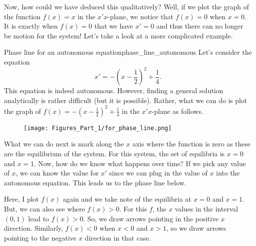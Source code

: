                 Now, how could we have deduced this qualitatively? Well, if we plot the graph of the function $f(x)=x$ in the $x'x$-plane, we notice that $f(x)=0$ when $x=0$.  It is exactly when $f(x)=0$ that we have $x'=0$ and thus there can no longer be motion for the system! Let's take a look at a more complicated example.



                \begin{ex}{Phase line for an autonomous equation}{phase_line_autonomous}
                Let's consider the equation
                \[
                x' = -\left(x-\frac{1}{2}\right)^2+\frac{1}{4}.
                \]
                This equation is indeed autonomous. However, finding a general solution analytically is rather difficult (but it is possible).  Rather, what we can do is plot the graph of $f(x)=-\left(x-\frac{1}{2}\right)^2+\frac{1}{4}$ in the $x'x$-plane as follows.
                \begin{figure}[H]
                    \centering
                    \texttt{[image: Figures\_Part\_1/for\_phase\_line.png]}
                \end{figure}
                What we can do next is mark along the $x$ axis where the function is zero as these are the equilibrium of the system. For this system, the set of equilibria is $x=0$ and $x=1$. Now, how do we know what happens over time? If we pick any value of $x$, we can know the value for $x'$ since we can plug in the value of $x$ into the autonomous equation.  This leads us to the phase line below.

                \begin{centering}
                \end{centering}

                Here, I plot $f(x)$ again and we take note of the equilibria at $x=0$ and $x=1$. But, we can also see where $f(x)>0$. For this $f$, the $x$ values in the interval $(0,1)$ lead to $f(x)>0$.  So, we draw arrows pointing in the positive $x$ direction. Similarly, $f(x)<0$ when $x<0$ and $x>1$, so we draw arrows pointing to the negative $x$ direction in that case.


\end{ex}
